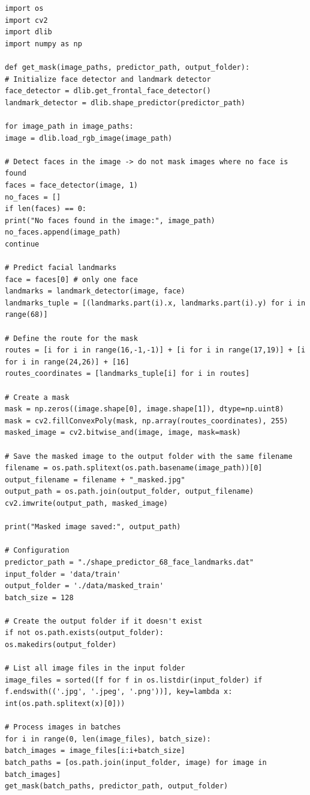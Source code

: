 \begin{lstlisting}[style=mystyle, caption={Functie om mask toe te voegen aan de volledige dataset \autocite{Serengil2020}}, label={sc:mask}]
import os
import cv2
import dlib
import numpy as np

def get_mask(image_paths, predictor_path, output_folder):
# Initialize face detector and landmark detector
face_detector = dlib.get_frontal_face_detector()
landmark_detector = dlib.shape_predictor(predictor_path)

for image_path in image_paths:
image = dlib.load_rgb_image(image_path)

# Detect faces in the image -> do not mask images where no face is found
faces = face_detector(image, 1)
no_faces = []
if len(faces) == 0:
print("No faces found in the image:", image_path)
no_faces.append(image_path)
continue

# Predict facial landmarks
face = faces[0] # only one face
landmarks = landmark_detector(image, face)
landmarks_tuple = [(landmarks.part(i).x, landmarks.part(i).y) for i in range(68)]

# Define the route for the mask
routes = [i for i in range(16,-1,-1)] + [i for i in range(17,19)] + [i for i in range(24,26)] + [16]
routes_coordinates = [landmarks_tuple[i] for i in routes]

# Create a mask
mask = np.zeros((image.shape[0], image.shape[1]), dtype=np.uint8)
mask = cv2.fillConvexPoly(mask, np.array(routes_coordinates), 255)
masked_image = cv2.bitwise_and(image, image, mask=mask)

# Save the masked image to the output folder with the same filename
filename = os.path.splitext(os.path.basename(image_path))[0]
output_filename = filename + "_masked.jpg"
output_path = os.path.join(output_folder, output_filename)
cv2.imwrite(output_path, masked_image)

print("Masked image saved:", output_path)

# Configuration
predictor_path = "./shape_predictor_68_face_landmarks.dat"
input_folder = 'data/train'
output_folder = './data/masked_train'
batch_size = 128

# Create the output folder if it doesn't exist
if not os.path.exists(output_folder):
os.makedirs(output_folder)

# List all image files in the input folder
image_files = sorted([f for f in os.listdir(input_folder) if f.endswith(('.jpg', '.jpeg', '.png'))], key=lambda x: int(os.path.splitext(x)[0]))

# Process images in batches
for i in range(0, len(image_files), batch_size):
batch_images = image_files[i:i+batch_size]
batch_paths = [os.path.join(input_folder, image) for image in batch_images]
get_mask(batch_paths, predictor_path, output_folder) 
\end{lstlisting} 
